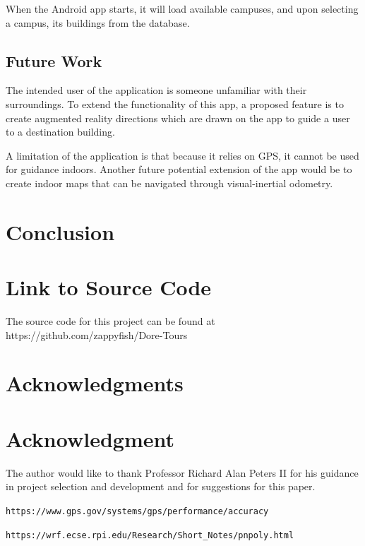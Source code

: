 \documentclass[12pt,journal,compsoc]{IEEEtran}
\begin{document}
When the Android app starts, it will load available campuses, and upon selecting a campus, its buildings from the database.

\subsection{Future Work}

The intended user of the application is someone unfamiliar with their surroundings. To extend the functionality of this app, a proposed feature is to create augmented reality directions which are drawn on the app to guide a user to a destination building.

A limitation of the application is that because it relies on GPS, it cannot be used for guidance indoors. Another future potential extension of the app would be to create indoor maps that can be navigated through visual-inertial odometry.

\section{Conclusion}



\appendices
\section{Link to Source Code}
The source code for this project can be found at https://github.com/zappyfish/Dore-Tours


\ifCLASSOPTIONcompsoc
  \section*{Acknowledgments}
\else
  \section*{Acknowledgment}
\fi


The author would like to thank Professor Richard Alan Peters II for his guidance in project selection and development and for suggestions for this paper.

\ifCLASSOPTIONcaptionsoff
  \newpage
\fi

\begin{thebibliography}{9}

\texttt{https://www.gps.gov/systems/gps/performance/accuracy}

\texttt{https://wrf.ecse.rpi.edu/Research/Short\_Notes/pnpoly.html}

\end{thebibliography}
\end{document}
